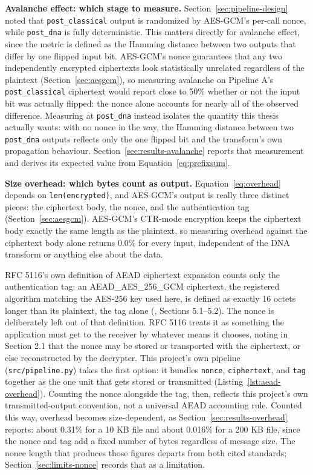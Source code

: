 \documentclass[12pt,a4paper,twoside]{report}
\numberwithin{equation}{chapter}
\begin{document}
\textbf{Avalanche effect: which stage to measure.} Section~\ref{sec:pipeline-design}
noted that \texttt{post\_classical} output is randomized by AES-GCM's
per-call nonce, while \texttt{post\_dna} is fully deterministic. This
matters directly for avalanche effect, since the metric is defined as
the Hamming distance between two outputs that differ by one flipped
input bit. AES-GCM's nonce guarantees that any two independently
encrypted ciphertexts look statistically unrelated regardless of the
plaintext (Section~\ref{sec:aesgcm}), so measuring avalanche on
Pipeline A's \texttt{post\_classical} ciphertext would report close to
50\% whether or not the input bit was actually flipped: the nonce
alone accounts for nearly all of the observed difference. Measuring at
\texttt{post\_dna} instead isolates the quantity this thesis actually
wants: with no nonce in the way, the Hamming distance between two
\texttt{post\_dna} outputs reflects only the one flipped bit and the
transform's own propagation behaviour.
Section~\ref{sec:results-avalanche} reports that measurement and
derives its expected value from Equation~\ref{eq:prefixsum}.

\textbf{Size overhead: which bytes count as output.} Equation~\ref{eq:overhead}
depends on \texttt{len(encrypted)}, and AES-GCM's output is really
three distinct pieces: the ciphertext body, the nonce, and the
authentication tag (Section~\ref{sec:aesgcm}). AES-GCM's CTR-mode
encryption keeps the ciphertext body exactly the same length as the
plaintext, so measuring overhead against the ciphertext body alone
returns 0.0\% for every input, independent of the DNA transform or
anything else about the data.

RFC 5116's own definition of AEAD ciphertext expansion counts only the
authentication tag: an AEAD\_AES\_256\_GCM ciphertext, the registered
algorithm matching the AES-256 key used here, is defined as exactly 16
octets longer than its plaintext, the tag alone (\cite{rfc5116},
Sections 5.1--5.2). The nonce is deliberately left out of that
definition. RFC 5116 treats it as something the application must get to
the receiver by whatever means it chooses, noting in Section 2.1 that
the nonce may be stored or transported with the ciphertext, or else
reconstructed by the decrypter. This project's own pipeline
(\texttt{src/pipeline.py}) takes the first option: it bundles
\texttt{nonce}, \texttt{ciphertext}, and \texttt{tag} together as the
one unit that gets stored or transmitted (Listing~\ref{lst:aead-overhead}).
Counting the nonce alongside the tag, then, reflects this project's own
transmitted-output convention, not a universal AEAD accounting rule.
Counted this way, overhead becomes size-dependent, as
Section~\ref{sec:results-overhead} reports: about 0.31\% for a 10 KB
file and about 0.016\% for a 200 KB file, since the nonce and tag add a
fixed number of bytes regardless of message size. The nonce length that
produces those figures departs from both cited standards;
Section~\ref{sec:limits-nonce} records that as a limitation.
\end{document}
